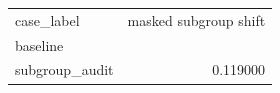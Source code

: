 \begin{tabular}{lr}
\toprule
case_label & masked subgroup shift \\
baseline &  \\
\midrule
subgroup_audit & 0.119000 \\
\bottomrule
\end{tabular}
